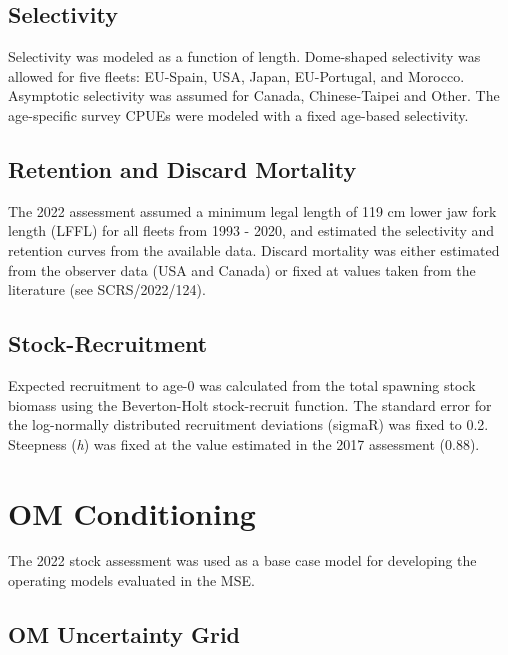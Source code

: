 \documentclass[
]{article}
\begin{document}
\hypertarget{selectivity}{%
\subsection{Selectivity}\label{selectivity}}

Selectivity was modeled as a function of length. Dome-shaped selectivity was allowed for five fleets: EU-Spain, USA, Japan, EU-Portugal, and Morocco. Asymptotic selectivity was assumed for Canada, Chinese-Taipei and Other. The age-specific survey CPUEs were modeled with a fixed age-based selectivity.

\hypertarget{retention-and-discard-mortality}{%
\subsection{Retention and Discard Mortality}\label{retention-and-discard-mortality}}

The 2022 assessment assumed a minimum legal length of 119 cm lower jaw fork length (LFFL) for all fleets from 1993 - 2020, and estimated the selectivity and retention curves from the available data. Discard mortality was either estimated from the observer data (USA and Canada) or fixed at values taken from the literature (see SCRS/2022/124).

\hypertarget{stock-recruitment}{%
\subsection{Stock-Recruitment}\label{stock-recruitment}}

Expected recruitment to age-0 was calculated from the total spawning stock biomass using the Beverton-Holt stock-recruit function. The standard error for the log-normally distributed recruitment deviations (sigmaR) was fixed to 0.2. Steepness (\emph{h}) was fixed at the value estimated in the 2017 assessment (0.88).

\hypertarget{om-conditioning}{%
\section{OM Conditioning}\label{om-conditioning}}

The 2022 stock assessment was used as a base case model for developing the operating models evaluated in the MSE.

\hypertarget{om-uncertainty-grid}{%
\subsection{OM Uncertainty Grid}\label{om-uncertainty-grid}}
\end{document}

